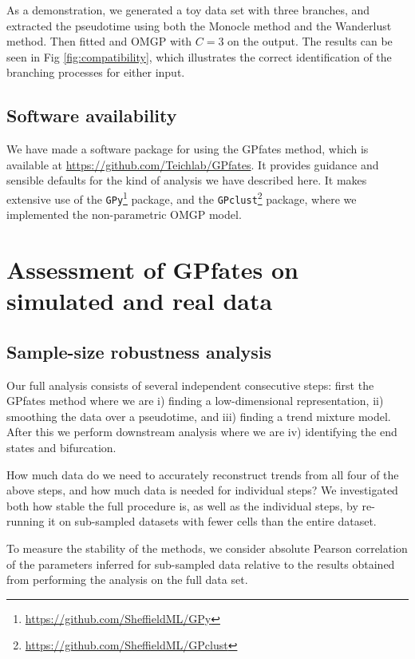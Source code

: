 As a demonstration, we generated a toy data set with three branches, and extracted the pseudotime using both the Monocle method and the Wanderlust method. Then fitted and OMGP with $ C = 3 $ on the output. The results can be seen in Fig \ref{fig:compatibility}, which illustrates the correct identification of the branching processes for either input.

\subsection{Software availability}

We have made a software package for using the GPfates method, which is available at \url{https://github.com/Teichlab/GPfates}. It provides guidance and sensible defaults for the kind of analysis we have described here. It makes extensive use of the \verb|GPy|\footnote{\url{https://github.com/SheffieldML/GPy}} package, and the \verb|GPclust|\footnote{\url{https://github.com/SheffieldML/GPclust}} package, where we implemented the non-parametric OMGP model.

\section{Assessment of GPfates on simulated and real data}

\subsection{Sample-size robustness analysis}

Our full analysis consists of several independent consecutive steps: first the GPfates method where we are i) finding a low-dimensional representation, ii) smoothing the data over a pseudotime, and iii) finding a trend mixture model. After this we perform downstream analysis where we are iv) identifying the end states and bifurcation.

How much data do we need to accurately reconstruct trends from all four of the above steps, and how much data is needed for individual steps? We investigated both how stable the full procedure is, as well as the individual steps, by re-running it on sub-sampled datasets with fewer cells than the entire dataset.

To measure the stability of the methods, we consider absolute Pearson correlation of the parameters inferred for sub-sampled data relative to the results obtained from performing the analysis on the full data set.

